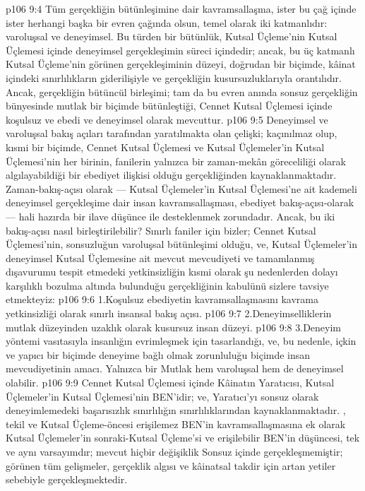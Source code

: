 \vs p106 9:4 Tüm gerçekliğin bütünleşimine dair kavramsallaşma, ister bu çağ içinde ister herhangi başka bir evren çağında olsun, temel olarak iki katmanlıdır: varoluşsal ve deneyimsel. Bu türden bir bütünlük, Kutsal Üçleme’nin Kutsal Üçlemesi içinde deneyimsel gerçekleşimin süreci içindedir; ancak, bu üç katmanlı Kutsal Üçleme’nin görünen gerçekleşiminin düzeyi, doğrudan bir biçimde, kâinat içindeki sınırlılıkların giderilişiyle ve gerçekliğin kusursuzluklarıyla orantılıdır. Ancak, gerçekliğin bütüncül birleşimi; tam da bu evren anında sonsuz gerçekliğin bünyesinde mutlak bir biçimde bütünleştiği, Cennet Kutsal Üçlemesi içinde koşulsuz ve ebedi ve deneyimsel olarak mevcuttur.
\vs p106 9:5 Deneyimsel ve varoluşsal bakış açıları tarafından yaratılmakta olan çelişki; kaçınılmaz olup, kısmi bir biçimde, Cennet Kutsal Üçlemesi ve Kutsal Üçlemeler’in Kutsal Üçlemesi’nin her birinin, fanilerin yalnızca bir zaman\hyp{}mekân göreceliliği olarak algılayabildiği bir ebediyet ilişkisi olduğu gerçekliğinden kaynaklanmaktadır. Zaman\hyp{}bakış\hyp{}açısı olarak --- Kutsal Üçlemeler’in Kutsal Üçlemesi’ne ait kademeli deneyimsel gerçekleşime dair insan kavramsallaşması, ebediyet bakış\hyp{}açısı\hyp{}olarak --- hali hazırda bir  ilave düşünce ile desteklenmek zorundadır. Ancak, bu iki bakış\hyp{}açısı nasıl birleştirilebilir? Sınırlı faniler için bizler; Cennet Kutsal Üçlemesi’nin, sonsuzluğun varoluşsal bütünleşimi olduğu, ve, Kutsal Üçlemeler’in deneyimsel Kutsal Üçlemesine ait mevcut mevcudiyeti ve tamamlanmış dışavurumu tespit etmedeki yetkinsizliğin kısmi olarak şu nedenlerden dolayı karşılıklı bozulma altında bulunduğu gerçekliğinin kabulünü sizlere tavsiye etmekteyiz:
\vs p106 9:6 1.\bibnobreakspace Koşulsuz ebediyetin kavramsallaşmasını kavrama yetkinsizliği olarak sınırlı insansal bakış açısı.
\vs p106 9:7 2.\bibnobreakspace Deneyimselliklerin mutlak düzeyinden uzaklık olarak kusursuz insan düzeyi.
\vs p106 9:8 3.\bibnobreakspace Deneyim yöntemi vasıtasıyla insanlığın evrimleşmek için tasarlandığı, ve, bu nedenle, içkin ve yapıcı bir biçimde deneyime bağlı olmak zorunluluğu biçimde insan mevcudiyetinin amacı. Yalnızca bir Mutlak hem varoluşsal hem de deneyimsel olabilir.
\vs p106 9:9 Cennet Kutsal Üçlemesi içinde Kâinatın Yaratıcısı, Kutsal Üçlemeler’in Kutsal Üçlemesi’nin BEN’idir; ve, Yaratıcı’yı sonsuz olarak deneyimlemedeki başarısızlık sınırlılığın sınırlılıklarından kaynaklanmaktadır. , tekil ve Kutsal Üçleme\hyp{}öncesi erişilemez BEN’in kavramsallaşmasına ek olarak Kutsal Üçlemeler’in  sonraki\hyp{}Kutsal Üçleme’si ve erişilebilir BEN’in düşüncesi, tek ve aynı varsayımdır; mevcut hiçbir değişiklik Sonsuz içinde gerçekleşmemiştir; görünen tüm gelişmeler, gerçeklik algısı ve kâinatsal takdir için artan yetiler sebebiyle gerçekleşmektedir.
